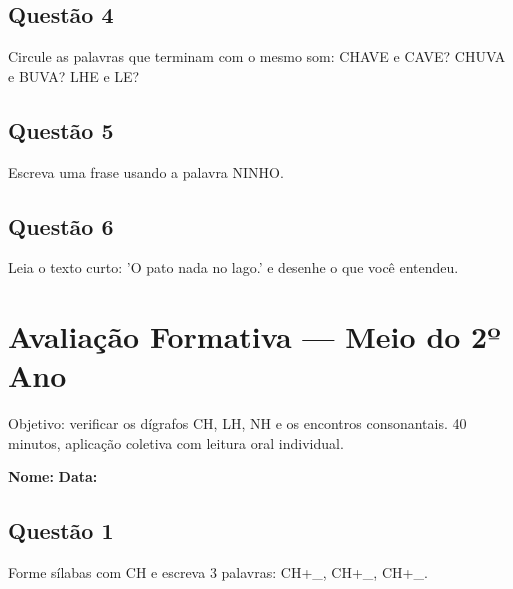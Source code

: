 \begin{center}
  \underline{\hspace{12cm}}
\end{center}

\subsection*{Questão 4}
Circule as palavras que terminam com o mesmo som: CHAVE e CAVE? CHUVA e BUVA? LHE e LE?

\begin{center}
  \underline{\hspace{12cm}}
\end{center}

\subsection*{Questão 5}
Escreva uma frase usando a palavra NINHO.

\begin{center}
  \underline{\hspace{12cm}}
\end{center}

\subsection*{Questão 6}
Leia o texto curto: 'O pato nada no lago.' e desenhe o que você entendeu.

\begin{center}
  \underline{\hspace{12cm}}
\end{center}

\clearpage

\section{Avaliação Formativa — Meio do 2º Ano}

\begin{avaliacao}
Objetivo: verificar os dígrafos CH, LH, NH e os encontros consonantais. 40 minutos, aplicação coletiva com leitura oral individual.
\end{avaliacao}

\noindent\textbf{Nome:} \underline{\hspace{4cm}} \quad \textbf{Data:} \underline{\hspace{2cm}}

\subsection*{Questão 1}
Forme sílabas com CH e escreva 3 palavras: CH+\_, CH+\_, CH+\_.

